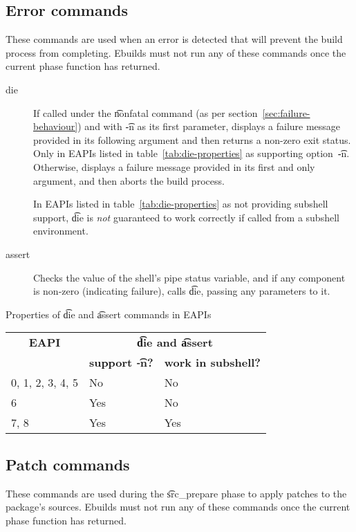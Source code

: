 \subsection{Error commands}
These commands are used when an error is detected that will prevent the build process from
completing. Ebuilds must not run any of these commands once the current phase function has returned.
\begin{description}
\item[die]  If called under the \t{nonfatal} command (as per
    section~\ref{sec:failure-behaviour}) and with \t{-n} as its first parameter, displays a failure
    message provided in its following argument and then returns a non-zero exit status. Only in
    EAPIs listed in table~\ref{tab:die-properties} as supporting option~\t{-n}. Otherwise, displays
    a failure message provided in its first and only argument, and then aborts the build process.

     In EAPIs listed in table~\ref{tab:die-properties} as not providing
    subshell support, \t{die} is \emph{not} guaranteed to work correctly if called from a subshell
    environment.
\item[assert] Checks the value of the shell's pipe status variable, and if any component is non-zero
    (indicating failure), calls \t{die}, passing any parameters to it.
\end{description}

\begin{centertable}{Properties of \t{die} and \t{assert} commands in EAPIs}
    \label{tab:die-properties}
    \begin{tabular}{lll}
      \toprule
      \multicolumn{1}{c}{\textbf{EAPI}} &
      \multicolumn{2}{c}{\textbf{\t{die} and \t{assert}}} \\
      &
      \multicolumn{1}{c}{\textbf{support \t{-n}?}} &
      \multicolumn{1}{c}{\textbf{work in subshell?}} \\
      \midrule
      0, 1, 2, 3, 4, 5  & No  & No  \\
      6                 & Yes & No  \\
      7, 8              & Yes & Yes \\
      \bottomrule
    \end{tabular}
\end{centertable}

\subsection{Patch commands}
These commands are used during the \t{src_prepare} phase to apply patches to the package's sources.
Ebuilds must not run any of these commands once the current phase function has returned.

